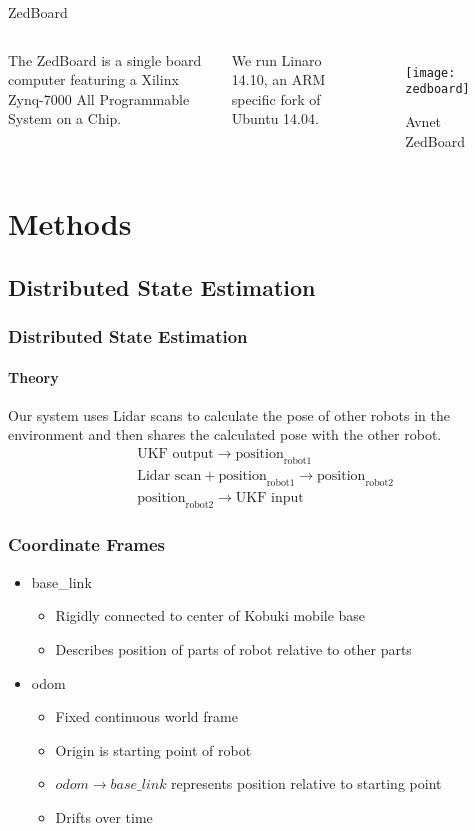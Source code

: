 \documentclass[14pt]{beamer}
\begin{document}
\begin{frame}{ZedBoard}
\begin{columns}
The ZedBoard is a single board computer featuring a Xilinx Zynq-7000 All Programmable System on a Chip.

\vspace{14pt}
We run Linaro 14.10, an ARM specific fork of Ubuntu 14.04.

\begin{figure}
\texttt{[image: zedboard]}
\caption{Avnet ZedBoard~\cite{ZedBoard}}
\end{figure}
\end{columns}
\end{frame}

\section{Methods}
\subsection{Distributed State Estimation}
\begin{frame}
\frametitle{Distributed State Estimation}
\framesubtitle{Theory}
Our system uses Lidar scans to calculate the pose of other robots in the environment and then shares the calculated pose with the other robot.
\pause
\begin{align}
&\text{UKF output} \rightarrow \text{position}_\text{robot1} \\
&\text{Lidar scan} + \text{position}_\text{robot1} \rightarrow \text{position}_\text{robot2} \\
&\text{position}_\text{robot2} \rightarrow \text{UKF input}
\end{align}
\setcounter{equation}{0}
\end{frame}

\begin{frame}
\frametitle{Coordinate Frames}
\begin{itemize}
\item base\_link
    \begin{itemize}
    \item Rigidly connected to center of Kobuki mobile base
    \item Describes position of parts of robot relative to other parts 
    \end{itemize}
\pause
\item odom
    \begin{itemize}
    \item Fixed continuous world frame
    \item Origin is starting point of robot
    \item $odom \rightarrow base\_link$ represents position relative to starting point
    \item Drifts over time
    \end{itemize}
\end{itemize}
\end{frame}
\end{document}
